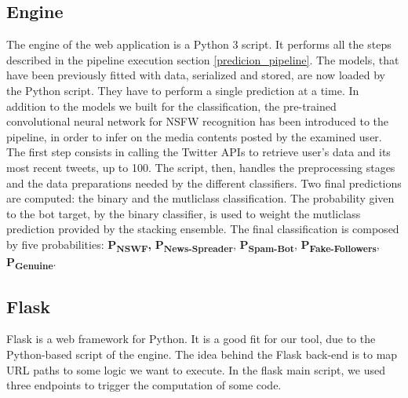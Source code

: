 \subsection{Engine}
The engine of the web application is a Python 3 script. It performs all the steps described in the pipeline execution section \ref{predicion_pipeline}.
The models, that have been previously fitted with data, serialized and stored, are now loaded by the Python script. They have to perform a single prediction at a time.
In addition to the models we built for the classification, the pre-trained convolutional neural network for NSFW recognition has been introduced to the pipeline, in order to infer on the media contents posted by the examined user.
The first step consists in calling the Twitter APIs to retrieve user's data and its most recent tweets, up to 100. 
The script, then, handles the preprocessing stages and the data preparations needed by the different classifiers.
Two final predictions are computed: the binary and the mutliclass classification.
The probability given to the bot target, by the binary classifier, is used to weight the mutliclass prediction provided by the stacking ensemble.
The final classification is composed by five probabilities: \textbf{P\textsubscript{NSWF},} \textbf{P\textsubscript{News-Spreader}}, \textbf{P\textsubscript{Spam-Bot}}, \textbf{P\textsubscript{Fake-Followers}}, \textbf{P\textsubscript{Genuine}}.
\subsection{Flask}
Flask is a web framework for Python. It is a good fit for our tool, due to the Python-based script of the engine.
The idea behind the Flask back-end is to map URL paths to some logic we want to execute. In the flask main script, we used three endpoints to trigger the computation of some code.

